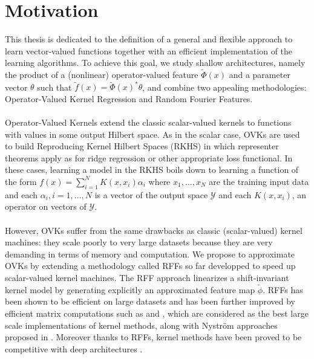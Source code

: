 \section{Motivation}
This thesis is dedicated to the definition of a general and flexible approach
to learn vector-valued functions together with an efficient implementation of
the learning algorithms. To achieve this goal, we study shallow architectures,
namely the product of a (nonlinear) operator-valued feature $\tilde{\Phi}(x)$
and a parameter vector $\theta$ such that $\tilde{f}(x) = \tilde{\Phi}(x)^*
\theta$, and combine two appealing methodologies: Operator-Valued Kernel
Regression and Random Fourier Features.
\paragraph{}
Operator-Valued Kernels \citep{Micchelli2005,Carmeli2010,Kadri_aistat10,
Brouard2011,Alvarez2012} extend the classic scalar-valued kernels to functions
with values in some output Hilbert space. As in the scalar case, \acfp{OVK} are
used to build Reproducing Kernel Hilbert Spaces (\acs{RKHS}) in which
representer theorems apply as for ridge regression or other appropriate loss
functional. In these cases, learning a model in the \acs{RKHS} boils down to
learning a function of the form $f(x)=\sum_{i=1}^N K(x,x_i)\alpha_i$ where
$x_1, \ldots, x_N$ are the training input data and each $\alpha_i, i=1, \ldots,
N$ is a vector of the output space $\mathcal{Y}$ and each $K(x,x_i)$, an
operator on vectors of $\mathcal{Y}$.
\paragraph{}
However, \acsp{OVK} suffer from the same drawbacks as classic (scalar-valued)
kernel machines: they scale poorly to very large datasets because they are very
demanding in terms of memory and computation. We propose to approximate OVKs by
extending a methodology called \acfp{RFF} \citep{Rahimi2007, Le2013, Yang2015,
sriper2015, Bach2015, sutherland2015, rudi2016generalization} so far developped
to speed up scalar-valued kernel machines. The \acs{RFF} approach linearizes a
shift-invariant kernel model by generating explicitly an approximated feature
map $\tilde{\phi}$. \acsp{RFF} has been shown to be efficient on large datasets
and has been further improved by efficient matrix computations such as
\citep[``FastFood'']{Le2013} and \citep[``SORF'']{felix2016orthogonal}, which
are considered as the best large scale implementations of kernel methods, along
with Nystr\"om approaches proposed in \citet{drineas2005nystrom}. Moreover
thanks to \acsp{RFF}, kernel methods have been proved to be competitive with
deep architectures \citep{lu2014scale, dai2014scalable, yang2015deep}.

